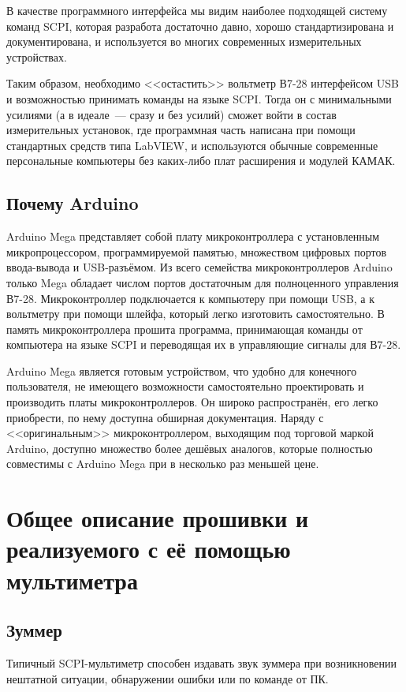 \documentclass[12pt, a4paper]{article}
\newcommand{\SCPI}{\mbox{SCPI}}
\newcommand{\V}{\mbox{В7-28}}
\newcommand{\Arduino}{Arduino Mega}
\begin{document}
В качестве программного интерфейса мы видим наиболее подходящей систему команд \SCPI, которая разработа достаточно давно, хорошо стандартизирована и документирована, и используется во многих современных измерительных устройствах.

Таким образом, необходимо <<остастить>> вольтметр \V{} интерфейсом USB и возможностью принимать команды на языке \SCPI. Тогда он с минимальными усилиями (а в идеале~--- сразу и без усилий) сможет войти в состав измерительных установок, где программная часть написана при помощи стандартных средств типа LabVIEW, и используются обычные современные персональные компьютеры без каких-либо плат расширения и модулей КАМАК.

\subsection{Почему Arduino}

\Arduino{} представляет собой плату микроконтроллера с установленным микропроцессором, программируемой памятью, множеством цифровых портов ввода-вывода и USB-разъёмом. Из всего семейства микроконтроллеров Arduino только Mega обладает числом портов достаточным для полноценного управления \V. Микроконтроллер подключается к компьютеру при помощи USB, а к вольтметру при помощи шлейфа, который легко изготовить самостоятельно.  В память микроконтроллера прошита программа, принимающая команды от компьютера на языке \SCPI{} и переводящая их в управляющие сигналы для \V.

\Arduino{} является готовым устройством, что удобно для конечного пользователя, не имеющего возможности самостоятельно проектировать и производить платы микроконтроллеров. Он широко распространён, его легко приобрести, по нему доступна обширная документация. Наряду с <<оригинальным>> микроконтроллером, выходящим под торговой маркой Arduino, доступно множество более дешёвых аналогов, которые полностью совместимы с \Arduino{} при в несколько раз меньшей цене.

\section{Общее описание прошивки и реализуемого с её помощью мультиметра}

\subsection{Зуммер}

Типичный SCPI-мультиметр способен издавать звук зуммера при возникновении нештатной ситуации, обнаружении ошибки или по команде от ПК.
\end{document}
